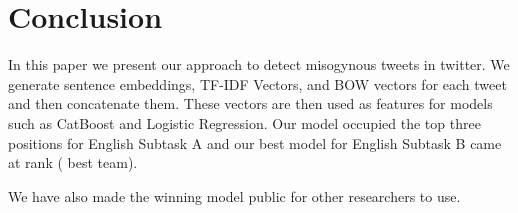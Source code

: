 \documentclass[11pt]{article}
\begin{document}
\section{Conclusion}

In this paper we present our approach to detect misogynous tweets in twitter. We generate sentence embeddings, TF-IDF Vectors, and BOW vectors for each tweet and then concatenate them. These vectors are then used as features for models such as CatBoost and Logistic Regression. Our model occupied the top three positions for English Subtask A and our best model for English Subtask B came at  rank ( best team).




We have also made the winning model public for other researchers to use.



\end{document}
